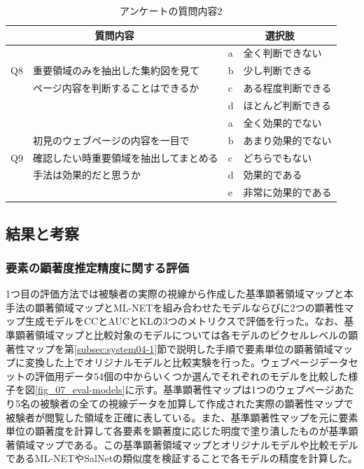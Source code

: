 \begin{table}[H]
    \caption{アンケートの質問内容2}
    \label{table:question02}
    \centering
    \begingroup
    \renewcommand{\arraystretch}{1} %
    \small
    \begin{tabular}{|l|l|l|l|}
        \hline
        \multicolumn{2}{|c|}{質問内容} & \multicolumn{2}{|c|}{選択肢} \\ \hline
        & & a & 全く判断できない \\ \cline{3-4}
        Q8 & 重要領域のみを抽出した集約図を見て & b & 少し判断できる \\ \cline{3-4}
        & ページ内容を判断することはできるか & c & ある程度判断できる \\ \cline{3-4}
        & & d & ほとんど判断できる \\ \hline
        & & a & 全く効果的でない \\ \cline{3-4}
        & 初見のウェブページの内容を一目で & b & あまり効果的でない \\ \cline{3-4}
        Q9 & 確認したい時重要領域を抽出してまとめる & c & どちらでもない \\ \cline{3-4}
        & 手法は効果的だと思うか & d & 効果的である \\ \cline{3-4}
        & & e & 非常に効果的である \\ \hline
        \end{tabular}
        \endgroup
\end{table}

\newpage
\subsection{結果と考察}
\subsubsection{要素の顕著度推定精度に関する評価}\label{subsec:evaluation1}
\par 1つ目の評価方法では被験者の実際の視線から作成した基準顕著領域マップと本手法の顕著領域マップとML-NETを組み合わせたモデルならびに2つの顕著性マップ生成モデルをCCとAUCとKLの3つのメトリクスで評価を行った。なお、基準顕著領域マップと比較対象のモデルについては各モデルのピクセルレベルの顕著性マップを第\ref{subsec:system04-1}節で説明した手順で要素単位の顕著領域マップに変換した上でオリジナルモデルと比較実験を行った。ウェブページデータセットの評価用データ54個の中からいくつか選んでそれぞれのモデルを比較した様子を図\ref{fig_07_eval-models}に示す。基準顕著性マップは1つのウェブページあたり5名の被験者の全ての視線データを加算して作成された実際の顕著性マップで被験者が閲覧した領域を正確に表している。また、基準顕著性マップを元に要素単位の顕著度を計算して各要素を顕著度に応じた明度で塗り潰したものが基準顕著領域マップである。この基準顕著領域マップとオリジナルモデルや比較モデルであるML-NETやSalNetの類似度を検証することで各モデルの精度を計算した。

